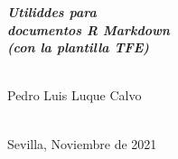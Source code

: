 \begin{titlepage}
\begin{minipage}{14cm}
{\Huge
\textbf{\textit{
Utiliddes para  \\[0.2cm]
documentos R Markdown \\[0.5cm]
(con la plantilla TFE)
}}}\\[0.75cm] 

\HRule \\[4cm]


{\Large

Pedro Luis Luque Calvo} \\[0.5cm]

{\large
Sevilla, Noviembre de 2021
}

\end{minipage}

\vfill %

\cleardoublepage
\thispagestyle{empty}
\end{titlepage}

\raggedbottom

